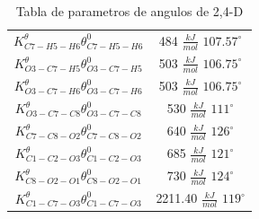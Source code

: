 \begin{table}[!h]
\begin{tabular}{|c|c|}
    $K^{\theta}_{C7-H5-H6} \theta^0_{C7-H5-H6}$& 484 $\frac{kJ}{mol}$ $107.57^{\circ}$\\
    $K^{\theta}_{O3-C7-H5} \theta^0_{O3-C7-H5}$& 503 $\frac{kJ}{mol}$ $106.75^{\circ}$\\
    $K^{\theta}_{O3-C7-H6} \theta^0_{O3-C7-H6}$& 503 $\frac{kJ}{mol}$ $106.75^{\circ}$\\
    $K^{\theta}_{O3-C7-C8} \theta^0_{O3-C7-C8}$& 530 $\frac{kJ}{mol}$ $111^{\circ}$\\
    $K^{\theta}_{C7-C8-O2} \theta^0_{C7-C8-O2}$& 640 $\frac{kJ}{mol}$ $126^{\circ}$\\
    $K^{\theta}_{C1-C2-O3} \theta^0_{C1-C2-O3}$& 685 $\frac{kJ}{mol}$ $121^{\circ}$\\
    $K^{\theta}_{C8-O2-O1} \theta^0_{C8-O2-O1}$& 730 $\frac{kJ}{mol}$ $124^{\circ}$\\
    $K^{\theta}_{C1-C7-O3} \theta^0_{C1-C7-O3}$& 2211.40 $\frac{kJ}{mol}$ $119^{\circ}$\\
    \hline
    \end{tabular}
    \caption{Tabla de parametros de angulos de 2,4-D}
    \label{tab:angulos24D}
\end{table}

